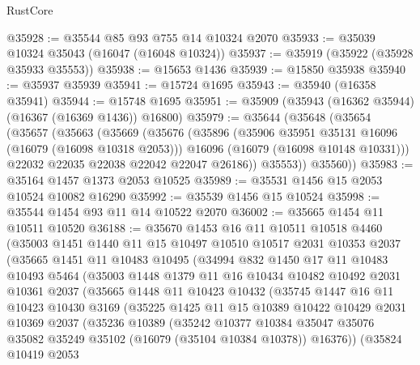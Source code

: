 \begin{lexlean}{RustCore}
\begin{coremodule}
@35928 := @35544 @85 @93 @755 @14 @10324 @2070
@35933 := @35039 @10324 @35043 (@16047 (@16048 @10324))
@35937 := @35919 (@35922 (@35928 @35933 @35553))
@35938 := @15653 @1436
@35939 := @15850 @35938
@35940 := @35937 @35939
@35941 := @15724 @1695
@35943 := @35940 (@16358 @35941)
@35944 := @15748 @1695
@35951 := @35909 (@35943 (@16362 @35944) (@16367 (@16369 @1436)) @16800)
@35979 := @35644
    (@35648
      (@35654
        (@35657
          (@35663
            (@35669
              (@35676
                (@35896
                  (@35906 @35951 @35131 @16096 (@16079 (@16098 @10318 @2053)))
                  @16096
                  (@16079 (@16098 @10148 @10331)))
                @22032
                @22035
                @22038
                @22042
                @22047
                @26186))
            @35553))
        @35560))
@35983 := @35164 @1457 @1373 @2053 @10525
@35989 := @35531 @1456 @15 @2053 @10524 @10082 @16290
@35992 := @35539 @1456 @15 @10524
@35998 := @35544 @1454 @93 @11 @14 @10522 @2070
@36002 := @35665 @1454 @11 @10511 @10520
@36188 := @35670
    @1453
    @16
    @11
    @10511
    @10518
    @4460
    (@35003
      @1451
      @1440
      @11
      @15
      @10497
      @10510
      @10517
      @2031
      @10353
      @2037
      (@35665
        @1451
        @11
        @10483
        @10495
        (@34994
          @832
          @1450
          @17
          @11
          @10483
          @10493
          @5464
          (@35003
            @1448
            @1379
            @11
            @16
            @10434
            @10482
            @10492
            @2031
            @10361
            @2037
            (@35665
              @1448
              @11
              @10423
              @10432
              (@35745
                @1447
                @16
                @11
                @10423
                @10430
                @3169
                (@35225
                  @1425
                  @11
                  @15
                  @10389
                  @10422
                  @10429
                  @2031
                  @10369
                  @2037
                  (@35236
                    @10389
                    (@35242
                      @10377
                      @10384
                      @35047
                      @35076
                      @35082
                      @35249
                      @35102
                      (@16079 (@35104 @10384 @10378))
                      @16376))
                  (@35824
                    @10419
                    @2053

\end{coremodule}
\end{lexlean}
